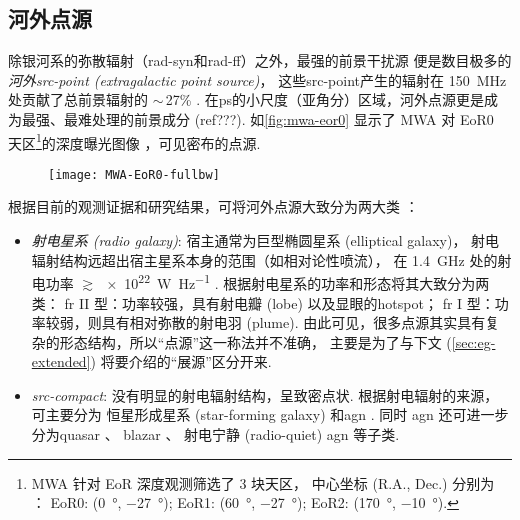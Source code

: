 \subsection{河外点源}

除银河系的弥散辐射（\ac{rad-syn}和\ac{rad-ff}）之外，最强的前景干扰源
便是数目极多的\emph{河外\acs{src-point} (extragalactic point source)}，
这些\ac{src-point}产生的辐射在 \SI{150}{\MHz} 处贡献了总前景辐射的
$\sim$\,27\% \cite{shaver1999}.
在\ac{ps}的小尺度（亚角分）区域，河外点源更是成为最强、最难处理的前景成分 (ref???).
如\autoref{fig:mwa-eor0} 显示了 MWA 对 EoR0 天区\footnote{%
  MWA 针对 EoR 深度观测筛选了 3 块天区，
  中心坐标 (R.A., Dec.\@) 分别为 \cite{beardsley2016}：
  EoR0: (\SI{0}{\degree}, \SI{-27}{\degree});
  EoR1: (\SI{60}{\degree}, \SI{-27}{\degree});
  EoR2: (\SI{170}{\degree}, \SI{-10}{\degree}).
}的深度曝光图像 \cite{offringa2016}，可见密布的点源.

\begin{figure}[htp]
  \centering
  \texttt{[image: MWA-EoR0-fullbw]}
  \label{fig:mwa-eor0}
\end{figure}

根据目前的观测证据和研究结果，可将河外点源大致分为两大类 \cite{padovani2016}：
\begin{itemize}
  \item \emph{射电星系 (radio galaxy)}:
    宿主通常为巨型椭圆星系 (elliptical galaxy)，
    射电辐射结构远超出宿主星系本身的范围（如相对论性喷流），
    在 \SI{1.4}{\GHz} 处的射电功率 $\gtrsim$\,\SI{e22}{\watt\per\hertz}
    \cite{ledlow1996}.
     根据射电星系的功率和形态将其大致分为两类：
    \ac{fr} II 型：功率较强，具有射电瓣 (lobe) 以及显眼的\ac{hotspot}；
    \ac{fr} I 型：功率较弱，则具有相对弥散的射电羽 (plume).
    由此可见，很多点源其实具有复杂的形态结构，所以\enquote{点源}这一称法并不准确，
    主要是为了与下文 (\autoref{sec:eg-extended})
    将要介绍的\enquote{展源}区分开来.

  \item \emph{\ac{src-compact}}:
    没有明显的射电辐射结构，呈致密点状.
    根据射电辐射的来源，可主要分为
    恒星形成星系 (star-forming galaxy) \cite{condon1992}
    和\ac{agn} \cite{urry1995,antonucci1993,padovani2017}.
    同时 \ac{agn} 还可进一步分为\ac{quasar} \cite{barthel1989,antonucci1993}、
    \ac{blazar} \cite{giommi2012,giommi2013}、
    射电宁静 (radio-quiet) \ac{agn} \cite{sandage1965,wilson1995} 等子类.
\end{itemize}

